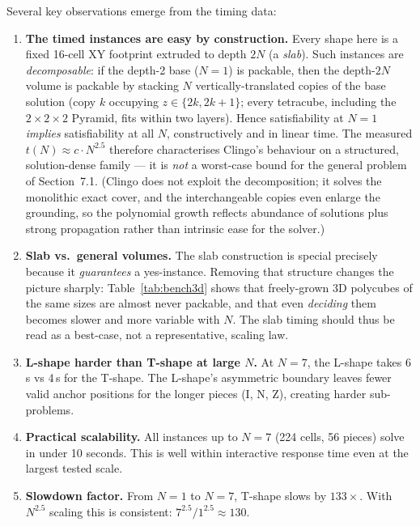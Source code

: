 \documentclass[a4paper,UKenglish,cleveref,autoref]{lipics-v2021}
\begin{document}
Several key observations emerge from the timing data:

\begin{enumerate}
  \item \textbf{The timed instances are easy by construction.}  Every shape
        here is a fixed 16-cell XY footprint extruded to depth $2N$ (a
        \emph{slab}).  Such instances are \emph{decomposable}: if the depth-2
        base ($N=1$) is packable, then the depth-$2N$ volume is packable by
        stacking $N$ vertically-translated copies of the base solution
        (copy $k$ occupying $z \in \{2k, 2k+1\}$; every tetracube, including
        the $2\times2\times2$ Pyramid, fits within two layers).  Hence
        satisfiability at $N=1$ \emph{implies} satisfiability at all $N$,
        constructively and in linear time.  The measured
        $t(N) \approx c \cdot N^{2.5}$ therefore characterises Clingo's
        behaviour on a structured, solution-dense family --- it is \emph{not}
        a worst-case bound for the general problem of Section~7.1.  (Clingo
        does not exploit the decomposition; it solves the monolithic exact
        cover, and the interchangeable copies even enlarge the grounding, so
        the polynomial growth reflects abundance of solutions plus strong
        propagation rather than intrinsic ease for the solver.)

  \item \textbf{Slab vs.\ general volumes.}  The slab construction is special
        precisely because it \emph{guarantees} a yes-instance.  Removing that
        structure changes the picture sharply: Table~\ref{tab:bench3d} shows
        that freely-grown 3D polycubes of the same sizes are almost never
        packable, and that even \emph{deciding} them becomes slower and more
        variable with $N$.  The slab timing should thus be read as a
        best-case, not a representative, scaling law.

  \item \textbf{L-shape harder than T-shape at large $N$.}  At $N=7$, the
        L-shape takes 6\,s vs 4\,s for the T-shape.  The L-shape's
        asymmetric boundary leaves fewer valid anchor positions for the
        longer pieces (I, N, Z), creating harder sub-problems.

  \item \textbf{Practical scalability.}  All instances up to $N=7$
        (224 cells, 56 pieces) solve in under 10 seconds.  This is
        well within interactive response time even at the largest tested scale.

  \item \textbf{Slowdown factor.}  From $N=1$ to $N=7$, T-shape slows by
        $133\times$.  With $N^{2.5}$ scaling this is consistent:
        $7^{2.5} / 1^{2.5} \approx 130$.
\end{enumerate}
\end{document}
